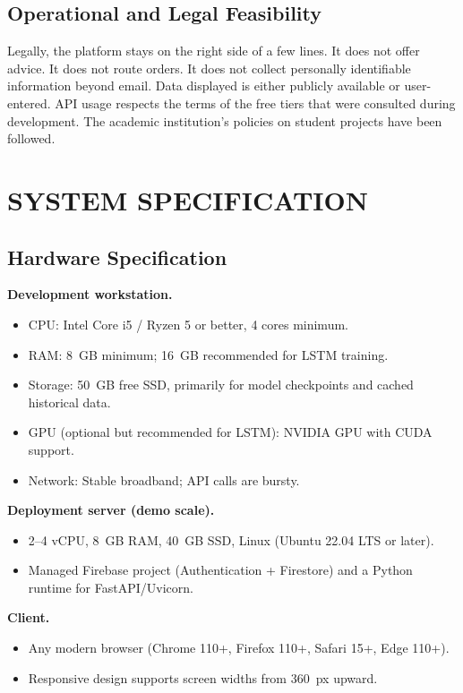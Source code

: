 \documentclass[12pt,a4paper]{report}
\numberwithin{equation}{chapter}
\begin{document}
\subsection{Operational and Legal Feasibility}

Legally, the platform stays on the right side of a few lines. It does not offer advice. It does not route orders. It does not collect personally identifiable information beyond email. Data displayed is either publicly available or user-entered. API usage respects the terms of the free tiers that were consulted during development. The academic institution's policies on student projects have been followed.

\section{SYSTEM SPECIFICATION}

\subsection{Hardware Specification}

\textbf{Development workstation.}

\begin{itemize}
  \item CPU: Intel Core i5 / Ryzen 5 or better, 4 cores minimum.
  \item RAM: 8~GB minimum; 16~GB recommended for LSTM training.
  \item Storage: 50~GB free SSD, primarily for model checkpoints and cached historical data.
  \item GPU (optional but recommended for LSTM): NVIDIA GPU with CUDA support.
  \item Network: Stable broadband; API calls are bursty.
\end{itemize}

\textbf{Deployment server (demo scale).}

\begin{itemize}
  \item 2--4 vCPU, 8~GB RAM, 40~GB SSD, Linux (Ubuntu 22.04 LTS or later).
  \item Managed Firebase project (Authentication + Firestore) and a Python runtime for FastAPI/Uvicorn.
\end{itemize}

\textbf{Client.}

\begin{itemize}
  \item Any modern browser (Chrome 110+, Firefox 110+, Safari 15+, Edge 110+).
  \item Responsive design supports screen widths from 360~px upward.
\end{itemize}
\end{document}
